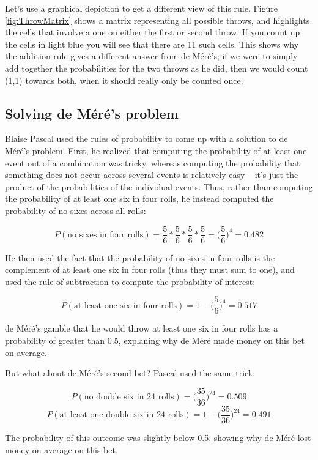 \documentclass[]{book}
\theoremstyle{definition}
\theoremstyle{definition}
\theoremstyle{definition}
\theoremstyle{remark}
\begin{document}
Let's use a graphical depiction to get a different view of this rule.
Figure \ref{fig:ThrowMatrix} shows a matrix representing all possible
throws, and highlights the cells that involve a one on either the first
or second throw. If you count up the cells in light blue you will see
that there are 11 such cells. This shows why the addition rule gives a
different answer from de Méré's; if we were to simply add together the
probabilities for the two throws as he did, then we would count (1,1)
towards both, when it should really only be counted once.

\subsection{Solving de Méré's problem}\label{solving-de-meres-problem}

Blaise Pascal used the rules of probability to come up with a solution
to de Méré's problem. First, he realized that computing the probability
of at least one event out of a combination was tricky, whereas computing
the probability that something does not occur across several events is
relatively easy -- it's just the product of the probabilities of the
individual events. Thus, rather than computing the probability of at
least one six in four rolls, he instead computed the probability of no
sixes across all rolls:

\[
P(\text{no sixes in four rolls}) = \frac{5}{6}*\frac{5}{6}*\frac{5}{6}*\frac{5}{6}=\bigg(\frac{5}{6}\bigg)^4=0.482
\]

He then used the fact that the probability of no sixes in four rolls is
the complement of at least one six in four rolls (thus they must sum to
one), and used the rule of subtraction to compute the probability of
interest:

\[
P(\text{at least one six in four rolls}) = 1 - \bigg(\frac{5}{6}\bigg)^4=0.517
\]

de Méré's gamble that he would throw at least one six in four rolls has
a probability of greater than 0.5, explaning why de Méré made money on
this bet on average.

But what about de Méré's second bet? Pascal used the same trick:

\[
P(\text{no double six in 24 rolls}) = \bigg(\frac{35}{36}\bigg)^{24}=0.509
\] \[
P(\text{at least one double six in 24 rolls}) = 1 - \bigg(\frac{35}{36}\bigg)^{24}=0.491
\]

The probability of this outcome was slightly below 0.5, showing why de
Méré lost money on average on this bet.
\end{document}
